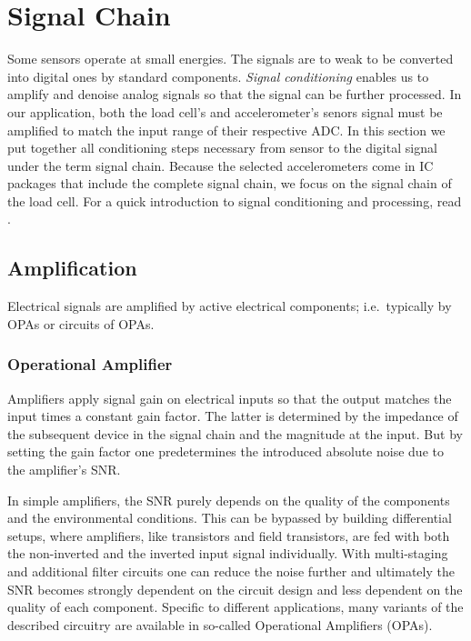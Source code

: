 \chapter{Signal Chain%
  \label{chap:\currfilebase}}

Some sensors operate at small energies. The signals are to weak to be converted into digital ones by standard components. \emph{Signal conditioning} enables us to amplify and denoise analog signals so that the signal can be further processed. In our application, both the load cell's and accelerometer's senors signal must be amplified to match the input range of their respective \ac{ADC}. In this section we put together all conditioning steps necessary from sensor to the digital signal under the term signal chain. Because the selected accelerometers come in \ac{IC} packages that include the complete signal chain, we focus on the signal chain of the load cell. For a quick introduction to signal conditioning and processing, read .

\section{Amplification}

Electrical signals are amplified by active electrical components; i.e.\ typically by \ac{OPA}s or circuits of \ac{OPA}s.

\subsection{Operational Amplifier}

Amplifiers apply signal gain on electrical inputs so that the output matches the input times a constant gain factor. The latter is determined by the impedance of the subsequent device in the signal chain and the magnitude at the input. But by setting the gain factor one predetermines the introduced absolute noise due to the amplifier's \ac{SNR}.

In simple amplifiers, the \ac{SNR} purely depends on the quality of the components and the environmental conditions. This can be bypassed by building differential setups, where amplifiers, like transistors and field transistors, are fed with both the non-inverted and the inverted input signal individually. With multi-staging and additional filter circuits one can reduce the noise further and ultimately the \ac{SNR} becomes strongly dependent on the circuit design and less dependent on the quality of each component. Specific to different applications, many variants of the described circuitry are available in so-called Operational Amplifiers (\acs{OPA}s).

